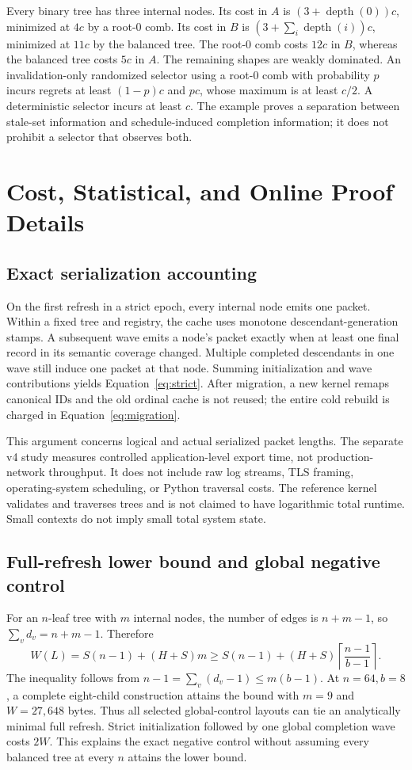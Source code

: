 Every binary tree has three internal nodes. Its cost in $A$ is $(3+\operatorname{depth}(0))c$, minimized at $4c$ by a root-0 comb. Its cost in $B$ is $(3+\sum_i\operatorname{depth}(i))c$, minimized at $11c$ by the balanced tree. The root-0 comb costs $12c$ in $B$, whereas the balanced tree costs $5c$ in $A$. The remaining shapes are weakly dominated. An invalidation-only randomized selector using a root-0 comb with probability $p$ incurs regrets at least $(1-p)c$ and $pc$, whose maximum is at least $c/2$. A deterministic selector incurs at least $c$. The example proves a separation between stale-set information and schedule-induced completion information; it does not prohibit a selector that observes both.

\section{Cost, Statistical, and Online Proof Details}\label{app:online}
\subsection{Exact serialization accounting}
On the first refresh in a strict epoch, every internal node emits one packet. Within a fixed tree and registry, the cache uses monotone descendant-generation stamps. A subsequent wave emits a node's packet exactly when at least one final record in its semantic coverage changed. Multiple completed descendants in one wave still induce one packet at that node. Summing initialization and wave contributions yields Equation~\eqref{eq:strict}. After migration, a new kernel remaps canonical IDs and the old ordinal cache is not reused; the entire cold rebuild is charged in Equation~\eqref{eq:migration}.

This argument concerns logical and actual serialized packet lengths. The separate v4 study measures controlled application-level export time, not production-network throughput. It does not include raw log streams, TLS framing, operating-system scheduling, or Python traversal costs. The reference kernel validates and traverses trees and is not claimed to have logarithmic total runtime. Small contexts do not imply small total system state.

\subsection{Full-refresh lower bound and global negative control}
For an $n$-leaf tree with $m$ internal nodes, the number of edges is $n+m-1$, so $\sum_vd_v=n+m-1$. Therefore
\begin{equation}
 W(L)=S(n-1)+(H+S)m\ge S(n-1)+(H+S)\left\lceil\frac{n-1}{b-1}\right\rceil.
\end{equation}
The inequality follows from $n-1=\sum_v(d_v-1)\le m(b-1)$. At $n=64,b=8$, a complete eight-child construction attains the bound with $m=9$ and $W=27,648$ bytes. Thus all selected global-control layouts can tie an analytically minimal full refresh. Strict initialization followed by one global completion wave costs $2W$. This explains the exact negative control without assuming every balanced tree at every $n$ attains the lower bound.

